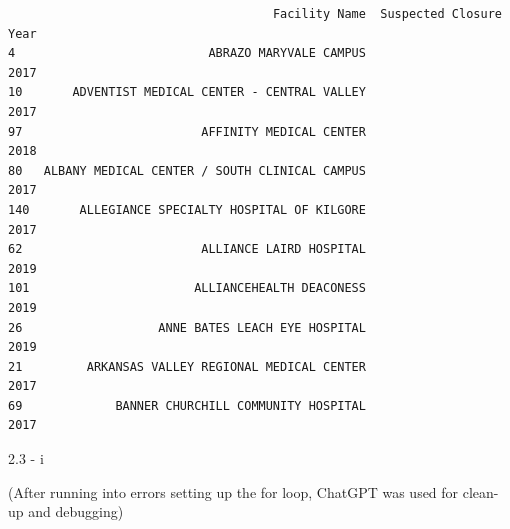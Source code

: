 \documentclass[
  letterpaper,
  DIV=11,
  numbers=noendperiod]{scrartcl}
\begin{document}
\begin{verbatim}
                                     Facility Name  Suspected Closure Year
4                           ABRAZO MARYVALE CAMPUS                    2017
10       ADVENTIST MEDICAL CENTER - CENTRAL VALLEY                    2017
97                         AFFINITY MEDICAL CENTER                    2018
80   ALBANY MEDICAL CENTER / SOUTH CLINICAL CAMPUS                    2017
140       ALLEGIANCE SPECIALTY HOSPITAL OF KILGORE                    2017
62                         ALLIANCE LAIRD HOSPITAL                    2019
101                       ALLIANCEHEALTH DEACONESS                    2019
26                   ANNE BATES LEACH EYE HOSPITAL                    2019
21         ARKANSAS VALLEY REGIONAL MEDICAL CENTER                    2017
69             BANNER CHURCHILL COMMUNITY HOSPITAL                    2017
\end{verbatim}

2.3 - i

(After running into errors setting up the for loop, ChatGPT was used for
clean-up and debugging)
\end{document}
